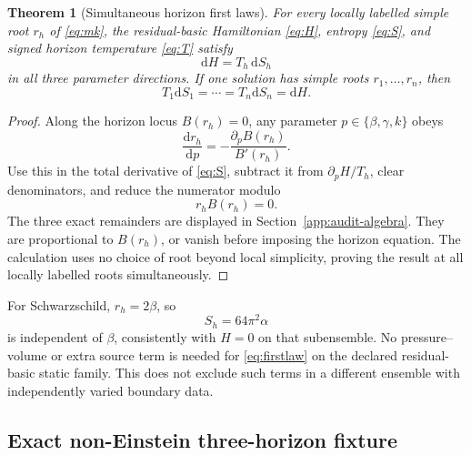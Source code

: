 \documentclass[11pt]{article}
\newtheorem{theorem}{Theorem}[section]
\theoremstyle{definition}
\theoremstyle{remark}
\newcommand{\dd}{\mathrm d}
\begin{document}
\begin{theorem}[Simultaneous horizon first laws]
\label{thm:firstlaw}
For every locally labelled simple root \(r_h\) of \eqref{eq:mk}, the
residual-basic Hamiltonian \eqref{eq:H}, entropy \eqref{eq:S}, and signed
horizon temperature \eqref{eq:T} satisfy
\begin{equation}\label{eq:firstlaw}
 \boxed{\dd H=T_h\,\dd S_h}
\end{equation}
in all three parameter directions.  If one solution has simple roots
\(r_1,\ldots,r_n\), then
\begin{equation}\label{eq:simultaneous}
 T_1\dd S_1=\cdots=T_n\dd S_n=\dd H.
\end{equation}
\end{theorem}

\begin{proof}
Along the horizon locus \(B(r_h)=0\), any parameter \(p\in
\{\beta,\gamma,k\}\) obeys
\begin{equation}
 \frac{\dd r_h}{\dd p}=-\frac{\partial_pB(r_h)}{B'(r_h)}.
\end{equation}
Use this in the total derivative of \eqref{eq:S}, subtract it from
\(\partial_pH/T_h\), clear denominators, and reduce the numerator modulo
\begin{equation}
 r_hB(r_h)=0.
\end{equation}
The three exact remainders are displayed in
Section~\ref{app:audit-algebra}.  They are proportional to \(B(r_h)\), or
vanish before imposing the horizon equation.  The calculation uses no
choice of root beyond local simplicity, proving the result at all locally
labelled roots simultaneously.
\end{proof}

For Schwarzschild, \(r_h=2\beta\), so
\[
 S_h=64\pi^2\alpha
\]
is independent of \(\beta\), consistently with \(H=0\) on that
subensemble.  No pressure--volume or extra source term is needed for
\eqref{eq:firstlaw} on the declared residual-basic static family.  This
does not exclude such terms in a different ensemble with independently
varied boundary data.

\subsection{Exact non-Einstein three-horizon fixture}
\end{document}

